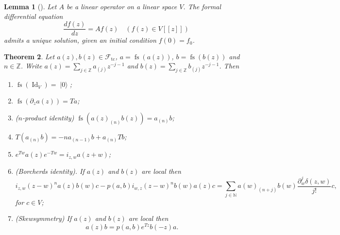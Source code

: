 \documentclass[a4paper, 12pt, reqno]{amsart}
\newtheorem{theorem}{Theorem}[subsection]
\newtheorem{lemma}[theorem]{Lemma}
\theoremstyle{remark}
\numberwithin{equation}{subsection}
\DeclareMathOperator{\Id}{Id}
\DeclareMathOperator{\vac}{|0\rangle}
\DeclareMathOperator{\fs}{fs}
\DeclareMathOperator{\tc}{tc}
\begin{document}
\begin{lemma}[{\cite[Proposition 4.3.2]{nozaradan_introduction_2008}}]
  \label{lmm:4}
  Let $A$ be a linear operator on a linear space $V$.
  The formal differential equation
  \begin{equation*}
    \frac{df(z)}{dz} = Af(z) \quad (f(z) \in V[[z]])
  \end{equation*}
  admits a unique solution, given an initial condition $f(0)=f_0$.
\end{lemma}

\begin{theorem}
  \label{thr:11}
  Let $a(z), b(z) \in \mathcal{F}_{\tc}$, $a = \fs(a(z))$, $b = \fs(b(z))$ and $n \in \mathbb{Z}$.
  Write $a(z) = \sum_{j \in \mathbb{Z}}a_{(j)}z^{-j - 1}$ and $b(z) = \sum_{j \in \mathbb{Z}}b_{(j)}z^{-j - 1}$.
  Then
  \begin{enumerate}
  \item $\fs(\Id_V) = \vac$;
  \item $\fs(\partial_za(z)) = Ta$;
  \item ($n$-product identity) $\fs(a(z)_{(n)}b(z)) = a_{(n)}b$;
  \item $T(a_{(n)}b) = -na_{(n - 1)}b + a_{(n)}Tb$;
  \item $e^{Tw}a(z)e^{-Tw} = i_{z, w}a(z + w)$;
  \item (Borcherds identity). If $a(z)$ and $b(z)$ are local then
    \begin{equation*}
      i_{z,w}(z-w)^na(z)b(w)c-p(a,b)i_{w,z}(z-w)^nb(w)a(z)c=\sum_{j\in \mathbb{N}}a(w)_{(n+j)}b(w)\frac{\partial^j_w\delta(z,w)}{j!}c,
    \end{equation*}
    for $c\in V$;
  \item (Skewsymmetry) If $a(z)$ and $b(z)$ are local then
    \begin{equation*}
      a(z)b=p(a,b)e^{Tz}b(-z)a.
    \end{equation*}
  \end{enumerate}
\end{theorem}
\end{document}
